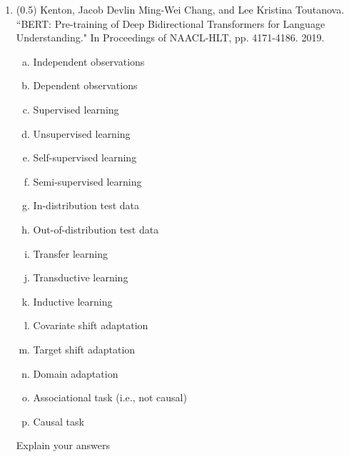\documentclass{article}
\begin{document}
\begin{enumerate}
 \newpage

\item (0.5) Kenton, Jacob Devlin Ming-Wei Chang, and Lee Kristina Toutanova. ``BERT: Pre-training of Deep Bidirectional Transformers for Language Understanding." In Proceedings of NAACL-HLT, pp. 4171-4186. 2019.
\begin{enumerate}[(a)]
\item Independent observations
\item Dependent observations
\item Supervised learning
\item Unsupervised learning
\item Self-supervised learning
\item Semi-supervised learning
\item In-distribution test data
\item Out-of-distribution test data
\item Transfer learning
\item Transductive learning
\item Inductive  learning
\item Covariate shift adaptation
\item Target shift adaptation
\item Domain adaptation
\item Associational task (i.e., not causal)
\item Causal task
\end{enumerate}
Explain your answers\\
\underline{\hspace{6in}}\\
\underline{\hspace{6in}}\\
\underline{\hspace{6in}}\\
\underline{\hspace{6in}}\\
\underline{\hspace{6in}}\\
\underline{\hspace{6in}}\\
\underline{\hspace{6in}}\\
\underline{\hspace{6in}}\\
\underline{\hspace{6in}}\\
\underline{\hspace{6in}}\\
\underline{\hspace{6in}}\\
\underline{\hspace{6in}}\\
\underline{\hspace{6in}}\\
\underline{\hspace{6in}}\\
\underline{\hspace{6in}}\\


\end{enumerate}
\end{document}
